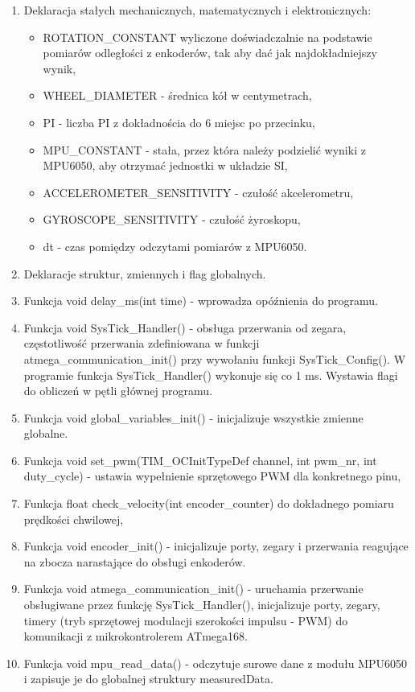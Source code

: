 \documentclass[a4paper,12pt,twoside,openany]{report}
\begin{document}
\begin{enumerate}
\item Deklaracja stałych mechanicznych, matematycznych i elektronicznych:
\begin{itemize}
\item ROTATION\_CONSTANT wyliczone doświadczalnie na podstawie pomiarów odległości z enkoderów, tak aby dać jak najdokładniejszy wynik,
\item WHEEL\_DIAMETER - średnica kół w centymetrach,
\item PI - liczba PI z dokładnościa do 6 miejsc po przecinku,
\item MPU\_CONSTANT - stała, przez która należy podzielić wyniki z MPU6050, aby otrzymać jednostki w układzie SI,
\item ACCELEROMETER\_SENSITIVITY - czułość akcelerometru,
\item GYROSCOPE\_SENSITIVITY - czułość żyroskopu,
\item dt - czas pomiędzy odczytami pomiarów z MPU6050.
\end{itemize}
\item Deklaracje struktur, zmiennych i flag globalnych.
\item Funkcja void delay\_ms(int time) - wprowadza opóźnienia do programu.
\item Funkcja void SysTick\_Handler() - obsługa przerwania od zegara, częstotliwość przerwania zdefiniowana w funkcji atmega\_communication\_init() przy wywołaniu funkcji SysTick\_Config(). W programie funkcja SysTick\_Handler() wykonuje się co 1 ms. Wystawia flagi do obliczeń w pętli głównej programu.
\item Funkcja void global\_variables\_init() - inicjalizuje wszystkie zmienne globalne.
\item Funkcja void set\_pwm(TIM\_OCInitTypeDef channel, int pwm\_nr, int duty\_cycle) - ustawia wypełnienie sprzętowego PWM dla konkretnego pinu,
\item Funkcja float check\_velocity(int encoder\_counter) do dokładnego pomiaru prędkości chwilowej,
\item Funkcja void encoder\_init() - inicjalizuje porty, zegary i przerwania reagujące na zbocza narastające do obsługi enkoderów.
\item Funkcja void atmega\_communication\_init() - uruchamia przerwanie obsługiwane przez funkcję SysTick\_Handler(), inicjalizuje porty, zegary, timery (tryb sprzętowej modulacji szerokości impulsu - PWM) do komunikacji z mikrokontrolerem ATmega168.
\item Funkcja void mpu\_read\_data() - odczytuje surowe dane z modułu MPU6050 i zapisuje je do globalnej struktury measuredData.

\end{enumerate}
\end{document}
